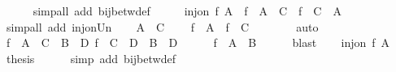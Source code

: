 \begin{isabellebody}
\ \ \ \ \isamarkupfalse%
\ {\isacharparenleft}{\kern0pt}simp{\isacharunderscore}{\kern0pt}all\ add{\isacharcolon}{\kern0pt}\ bij{\isacharunderscore}{\kern0pt}betw{\isacharunderscore}{\kern0pt}def{\isacharparenright}{\kern0pt}\isanewline
\ \ \isamarkupfalse%
\ \isamarkupfalse%
\ {\isacartoucheopen}inj{\isacharunderscore}{\kern0pt}on\ f\ A{\isacartoucheclose}\ \ {\isacartoucheopen}f\ {\isacharbackquote}{\kern0pt}\ {\isacharparenleft}{\kern0pt}A\ {\isacharminus}{\kern0pt}\ C{\isacharparenright}{\kern0pt}\ {\isasyminter}\ f\ {\isacharbackquote}{\kern0pt}\ {\isacharparenleft}{\kern0pt}C\ {\isacharminus}{\kern0pt}\ A{\isacharparenright}{\kern0pt}\ {\isacharequal}{\kern0pt}\ {\isacharbraceleft}{\kern0pt}{\isacharbraceright}{\kern0pt}{\isacartoucheclose}\isanewline
\ \ \ \ \isamarkupfalse%
\ {\isacharparenleft}{\kern0pt}simp{\isacharunderscore}{\kern0pt}all\ add{\isacharcolon}{\kern0pt}\ inj{\isacharunderscore}{\kern0pt}on{\isacharunderscore}{\kern0pt}Un{\isacharparenright}{\kern0pt}\isanewline
\ \ \isamarkupfalse%
\ {\isacartoucheopen}A\ {\isasyminter}\ C\ {\isacharequal}{\kern0pt}\ {\isacharbraceleft}{\kern0pt}{\isacharbraceright}{\kern0pt}{\isacartoucheclose}\ \isamarkupfalse%
\ {\isacartoucheopen}f\ {\isacharbackquote}{\kern0pt}\ A\ {\isasyminter}\ f\ {\isacharbackquote}{\kern0pt}\ C\ {\isacharequal}{\kern0pt}\ {\isacharbraceleft}{\kern0pt}{\isacharbraceright}{\kern0pt}{\isacartoucheclose}\isanewline
\ \ \ \ \isamarkupfalse%
\ auto\isanewline
\ \ \isamarkupfalse%
\ {\isacartoucheopen}f\ {\isacharbackquote}{\kern0pt}\ {\isacharparenleft}{\kern0pt}A\ {\isasymunion}\ C{\isacharparenright}{\kern0pt}\ {\isacharequal}{\kern0pt}\ B\ {\isasymunion}\ D{\isacartoucheclose}\ {\isacartoucheopen}f\ {\isacharbackquote}{\kern0pt}\ C\ {\isacharequal}{\kern0pt}\ D{\isacartoucheclose}\ \ {\isacartoucheopen}B\ {\isasyminter}\ D\ {\isacharequal}{\kern0pt}\ {\isacharbraceleft}{\kern0pt}{\isacharbraceright}{\kern0pt}{\isacartoucheclose}\isanewline
\ \ \isamarkupfalse%
\ {\isacartoucheopen}f\ {\isacharbackquote}{\kern0pt}\ A\ {\isacharequal}{\kern0pt}\ B{\isacartoucheclose}\isanewline
\ \ \ \ \isamarkupfalse%
\ blast\isanewline
\ \ \isamarkupfalse%
\ {\isacartoucheopen}inj{\isacharunderscore}{\kern0pt}on\ f\ A{\isacartoucheclose}\ \isamarkupfalse%
\ {\isacharquery}{\kern0pt}thesis\isanewline
\ \ \ \ \isamarkupfalse%
\ {\isacharparenleft}{\kern0pt}simp\ add{\isacharcolon}{\kern0pt}\ bij{\isacharunderscore}{\kern0pt}betw{\isacharunderscore}{\kern0pt}def{\isacharparenright}{\kern0pt}\isanewline

\end{isabellebody}
